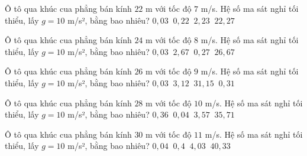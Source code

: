\begin{ex}
Ô tô qua khúc cua phẳng bán kính $22$ m với tốc độ $7$ m/s. Hệ số ma sát nghỉ tối thiểu, lấy $g=10$ m/s², bằng bao nhiêu?
\choice
{$0,03\ \mathrm{}$}
{\True $0,22\ \mathrm{}$}
{$2,23\ \mathrm{}$}
{$22,27\ \mathrm{}$}
\end{ex}

\begin{ex}
Ô tô qua khúc cua phẳng bán kính $24$ m với tốc độ $8$ m/s. Hệ số ma sát nghỉ tối thiểu, lấy $g=10$ m/s², bằng bao nhiêu?
\choice
{$0,03\ \mathrm{}$}
{$2,67\ \mathrm{}$}
{\True $0,27\ \mathrm{}$}
{$26,67\ \mathrm{}$}
\end{ex}

\begin{ex}
Ô tô qua khúc cua phẳng bán kính $26$ m với tốc độ $9$ m/s. Hệ số ma sát nghỉ tối thiểu, lấy $g=10$ m/s², bằng bao nhiêu?
\choice
{$0,03\ \mathrm{}$}
{$3,12\ \mathrm{}$}
{$31,15\ \mathrm{}$}
{\True $0,31\ \mathrm{}$}
\end{ex}

\begin{ex}
Ô tô qua khúc cua phẳng bán kính $28$ m với tốc độ $10$ m/s. Hệ số ma sát nghỉ tối thiểu, lấy $g=10$ m/s², bằng bao nhiêu?
\choice
{\True $0,36\ \mathrm{}$}
{$0,04\ \mathrm{}$}
{$3,57\ \mathrm{}$}
{$35,71\ \mathrm{}$}
\end{ex}

\begin{ex}
Ô tô qua khúc cua phẳng bán kính $30$ m với tốc độ $11$ m/s. Hệ số ma sát nghỉ tối thiểu, lấy $g=10$ m/s², bằng bao nhiêu?
\choice
{$0,04\ \mathrm{}$}
{\True $0,4\ \mathrm{}$}
{$4,03\ \mathrm{}$}
{$40,33\ \mathrm{}$}
\end{ex}


